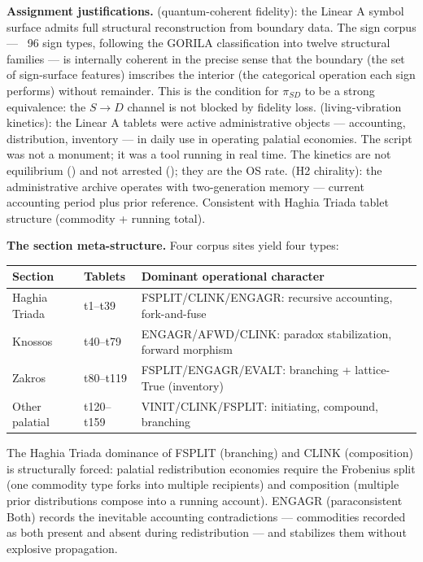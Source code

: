 \documentclass[12pt,a4paper]{article}
\makeatletter
\renewcommand{\_}{\ig@origunderscore\discretionary{}{}{}}
\makeatother
\begin{document}
\textbf{Assignment justifications.}
 (quantum-coherent fidelity): the Linear A symbol surface admits full structural reconstruction from boundary data. The sign corpus --- ~96 sign types, following the GORILA classification into twelve structural families --- is internally coherent in the precise sense that the boundary (the set of sign-surface features) imscribes the interior (the categorical operation each sign performs) without remainder. This is the condition for $\pi_{SD}$ to be a strong equivalence: the $S \to D$ channel is not blocked by fidelity loss.
 (living-vibration kinetics): the Linear A tablets were active administrative objects --- accounting, distribution, inventory --- in daily use in operating palatial economies. The script was not a monument; it was a tool running in real time. The kinetics are not equilibrium () and not arrested (); they are the OS rate.
 (H2 chirality): the administrative archive operates with two-generation memory --- current accounting period plus prior reference. Consistent with Haghia Triada tablet structure (commodity + running total).

\textbf{The section meta-structure.} Four corpus sites yield four types:

\begin{center}
\small
\begin{tabular}{@{} l l l @{}}
\toprule
\textbf{Section} & \textbf{Tablets} & \textbf{Dominant operational character} \\
\midrule
Haghia Triada  & t1--t39   & FSPLIT/CLINK/ENGAGR: recursive accounting, fork-and-fuse \\
Knossos        & t40--t79  & ENGAGR/AFWD/CLINK: paradox stabilization, forward morphism \\
Zakros         & t80--t119 & FSPLIT/ENGAGR/EVALT: branching + lattice-True (inventory) \\
Other palatial & t120--t159 & VINIT/CLINK/FSPLIT: initiating, compound, branching \\
\bottomrule
\end{tabular}
\end{center}

The Haghia Triada dominance of FSPLIT (branching) and CLINK (composition) is structurally forced: palatial redistribution economies require the Frobenius split (one commodity type forks into multiple recipients) and composition (multiple prior distributions compose into a running account). ENGAGR (paraconsistent Both) records the inevitable accounting contradictions --- commodities recorded as both present and absent during redistribution --- and stabilizes them without explosive propagation.
\end{document}

